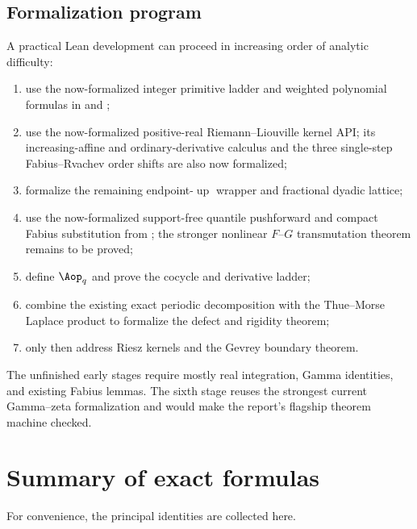 \documentclass[11pt,oneside]{article}
\theoremstyle{definition}
\theoremstyle{remark}
\newcommand{\Up}{\operatorname{up}}
\newcommand{\1}{\mathbf 1}
\begin{document}
\subsection{Formalization program}

A practical Lean development can proceed in increasing order of analytic difficulty:
\begin{enumerate}
\item[\(\checkmark\)] use the now-formalized integer primitive ladder and weighted polynomial
       formulas in  and ;
\item[\(\checkmark\)] use the now-formalized positive-real Riemann--Liouville kernel API;
      its increasing-affine and ordinary-derivative calculus and the three single-step
      Fabius--Rvachev order shifts are also now formalized;
\item formalize the remaining endpoint-\(\Up\) wrapper and fractional dyadic lattice;
\item[\(\checkmark\)] use the now-formalized support-free quantile pushforward and compact
      Fabius substitution from ; the stronger nonlinear
      \(F\)--\(G\) transmutation theorem remains to be proved;
\item define $\Aop_q$ and prove the cocycle and derivative ladder;
\item combine the existing exact periodic decomposition with the Thue--Morse Laplace product
      to formalize the defect and rigidity theorem;
\item only then address Riesz kernels and the Gevrey boundary theorem.
\end{enumerate}
The unfinished early stages require mostly real integration, Gamma identities, and existing
Fabius lemmas.  The sixth stage reuses the strongest current Gamma--zeta formalization and would make
the report's flagship theorem machine checked.

\section{Summary of exact formulas}
\label{p7:sec:summary-formulas}

For convenience, the principal identities are collected here.
\end{document}
